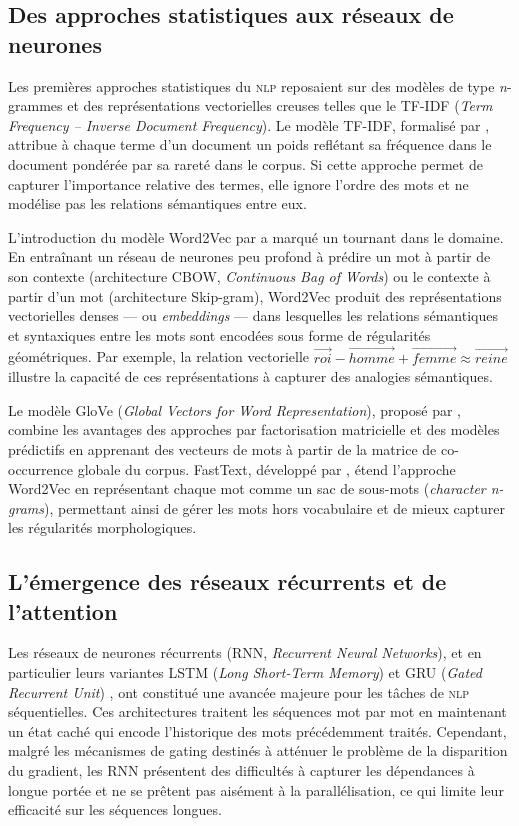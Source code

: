 \documentclass[12pt,a4paper,oneside]{report}
\newcommand{\nlp}{\textsc{nlp}}
\begin{document}
\subsection{Des approches statistiques aux réseaux de neurones}

Les premières approches statistiques du \nlp{} reposaient sur des modèles de type \textit{n}-grammes et des représentations vectorielles creuses telles que le TF-IDF (\textit{Term Frequency -- Inverse Document Frequency}). Le modèle TF-IDF, formalisé par \citet{sparckjones1972}, attribue à chaque terme d'un document un poids reflétant sa fréquence dans le document pondérée par sa rareté dans le corpus. Si cette approche permet de capturer l'importance relative des termes, elle ignore l'ordre des mots et ne modélise pas les relations sémantiques entre eux.

L'introduction du modèle Word2Vec par \citet{mikolov2013} a marqué un tournant dans le domaine. En entraînant un réseau de neurones peu profond à prédire un mot à partir de son contexte (architecture CBOW, \textit{Continuous Bag of Words}) ou le contexte à partir d'un mot (architecture Skip-gram), Word2Vec produit des représentations vectorielles denses --- ou \textit{embeddings} --- dans lesquelles les relations sémantiques et syntaxiques entre les mots sont encodées sous forme de régularités géométriques. Par exemple, la relation vectorielle $\vec{roi} - \vec{homme} + \vec{femme} \approx \vec{reine}$ illustre la capacité de ces représentations à capturer des analogies sémantiques.

Le modèle GloVe (\textit{Global Vectors for Word Representation}), proposé par \citet{pennington2014}, combine les avantages des approches par factorisation matricielle et des modèles prédictifs en apprenant des vecteurs de mots à partir de la matrice de co-occurrence globale du corpus. FastText, développé par \citet{bojanowski2017}, étend l'approche Word2Vec en représentant chaque mot comme un sac de sous-mots (\textit{character n-grams}), permettant ainsi de gérer les mots hors vocabulaire et de mieux capturer les régularités morphologiques.

\subsection{L'émergence des réseaux récurrents et de l'attention}

Les réseaux de neurones récurrents (RNN, \textit{Recurrent Neural Networks}), et en particulier leurs variantes LSTM (\textit{Long Short-Term Memory}) \citep{hochreiter1997} et GRU (\textit{Gated Recurrent Unit}) \citep{cho2014}, ont constitué une avancée majeure pour les tâches de \nlp{} séquentielles. Ces architectures traitent les séquences mot par mot en maintenant un état caché qui encode l'historique des mots précédemment traités. Cependant, malgré les mécanismes de gating destinés à atténuer le problème de la disparition du gradient, les RNN présentent des difficultés à capturer les dépendances à longue portée et ne se prêtent pas aisément à la parallélisation, ce qui limite leur efficacité sur les séquences longues.
\end{document}
